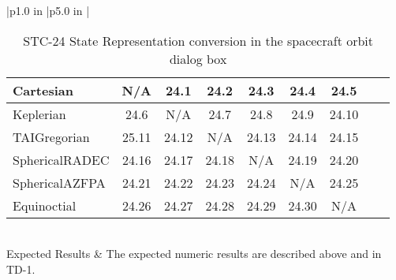 \begin{table}[htbp!]
\begin{tabular}{|p{1.0 in} |p{5.0 in} |}
\begin{centering}
\begin{tabular}{|l|c|c|c|c|c|c|c|c|}
             Cartesian & N/A & 24.1 & 24.2 & 24.3 & 24.4 & 24.5\\ \hline
             Keplerian & 24.6 & N/A & 24.7 & 24.8 & 24.9 & 24.10 \\ \hline
             TAIGregorian & 25.11 & 24.12 & N/A & 24.13 & 24.14 & 24.15 \\ \hline
             SphericalRADEC & 24.16 & 24.17 & 24.18 & N/A & 24.19 & 24.20 \\ \hline
             SphericalAZFPA & 24.21 & 24.22 & 24.23 & 24.24 & N/A & 24.25 \\ \hline
             Equinoctial & 24.26 & 24.27 & 24.28 & 24.29 & 24.30 &  N/A\\ \hline
          \end{tabular}
          \end{centering} \vspace{0.1 in}\\
         \hline
         Expected Results & The expected numeric results are described above and in TD-1.\\
      \hline
\end{tabular}
   \label{Table:STC-24}
   \caption{STC-24 State Representation conversion in the spacecraft orbit dialog box}
\end{table} 